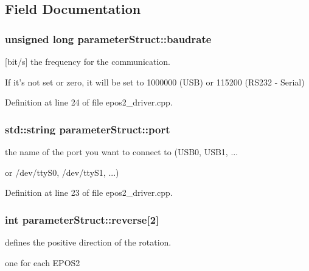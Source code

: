 \subsection{Field Documentation}
\hypertarget{structparameterStruct_a982408106af37061e986217861403eac}{
\subsubsection[{baudrate}]{\setlength{\rightskip}{0pt plus 5cm}unsigned long parameter\-Struct\-::baudrate}}\label{structparameterStruct_a982408106af37061e986217861403eac}


\mbox{[}bit/s\mbox{]} the frequency for the communication. 

If it's not set or zero, it will be set to 1000000 (U\-S\-B) or 115200 (R\-S232 -\/ Serial) 

Definition at line 24 of file epos2\-\_\-driver.\-cpp.

\hypertarget{structparameterStruct_aeae557e7b574ce3457b2089ed9599aa3}{
\subsubsection[{port}]{\setlength{\rightskip}{0pt plus 5cm}std\-::string parameter\-Struct\-::port}}\label{structparameterStruct_aeae557e7b574ce3457b2089ed9599aa3}


the name of the port you want to connect to (U\-S\-B0, U\-S\-B1, ... 

or /dev/tty\-S0, /dev/tty\-S1, ...) 

Definition at line 23 of file epos2\-\_\-driver.\-cpp.

\hypertarget{structparameterStruct_ab17c626ad31a539fcc209bab7a1eb58f}{
\subsubsection[{reverse}]{\setlength{\rightskip}{0pt plus 5cm}int parameter\-Struct\-::reverse\mbox{[}2\mbox{]}}}\label{structparameterStruct_ab17c626ad31a539fcc209bab7a1eb58f}


defines the positive direction of the rotation. 

one for each E\-P\-O\-S2 

